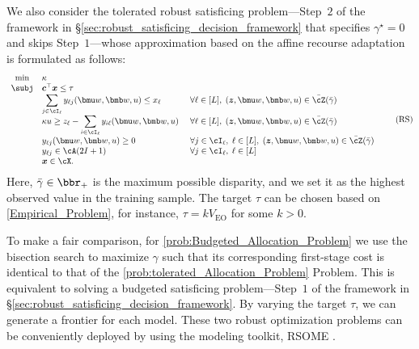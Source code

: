 \documentclass[opre, blindrev]{informs4}
\newcommand{\1}[1]{\mathds{1}{\left(#1\right)}}
\begin{document}
We also consider the tolerated robust satisficing problem---Step~$2$ of the framework in \S \ref{sec:robust_satisficing_decision_framework} that specifies $\gamma^\star = 0$ and skips Step~$1$---whose approximation based on the affine recourse adaptation is formulated as follows:
\begin{equation} \label{prob:tolerated_Allocation_Problem}
\begin{array}{cll}
     \min & \kappa \\
     \subj & \bm c^\top \bm x \leq \tau \\
     & \displaystyle \sum_{j \in \cI_\ell} y_{\ell j}({\bmu w}, {\bmb w},u) \leq x_\ell \quad & ~\forall \ell \in [L],\; ({\bm z}, {\bmu w}, {\bmb w},u) \in \bar{\cZ} (\bar{\gamma}) \\
     & \displaystyle \kappa u \geq z_\ell - \sum_{i \in \cI_\ell} y_{i \ell}({\bmu w}, {\bmb w},u)  &~ \forall \ell \in [L],\; ({\bm z}, {\bmu w}, {\bmb w},u) \in \bar{\cZ} (\bar{\gamma}) \\
     & \displaystyle y_{\ell j}(\bmu w, \bmb w, u) \geq 0 &~ \forall  j \in \cI_\ell,\; \ell \in [L],\; (\bm z, \bmu w, \bmb w, u) \in \bar \cZ(\bar{\gamma}) \\
     & \displaystyle y_{\ell j} \in \cA(2I+1) &~ \forall j \in \cI_\ell,\; \ell \in [L] \\
     & \displaystyle {\bm x} \in \cX.
\end{array}
\tag{RS}
\end{equation}
Here, $\bar \gamma \in \bbr_+$ is the maximum possible disparity, and we set it as the highest observed value in the training sample. The target $\tau$ can be chosen based on \ref{Empirical_Problem}, for instance, $\tau = k V_{\mathrm{EO}}$ for some $k > 0$. 

To make a fair comparison, for \ref{prob:Budgeted_Allocation_Problem} we use the bisection search to maximize $\gamma$ such that its corresponding first-stage cost is identical to that of the \ref{prob:tolerated_Allocation_Problem} Problem. This is equivalent to solving a budgeted satisficing problem---Step~$1$ of the framework in \S \ref{sec:robust_satisficing_decision_framework}. By varying the target $\tau$, we can generate a frontier for each model. These two robust optimization problems can be conveniently deployed by using the modeling toolkit, RSOME \citep{Chen_Sim_Xiong_2020robust,Chen_Xiong_rsome}.
\end{document}
